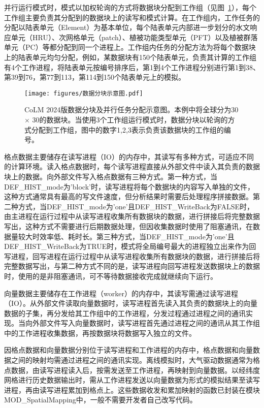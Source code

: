 \documentclass[a4paper,12pt,twoside]{article}
\begin{document}
并行运行模式时，模式以加权轮询的方式将数据块分配到工作组（见图~\ref{fig:fig_block}），每个工作组主要负责其分配到的数据块上的读写和模式计算。在工作组内，工作任务的分配以陆表单元（Element）为基本单位，每个陆表单元内部进一步划分的水文响应单元（HRU）、次网格单元（patch）、植被功能类型单元（PFT）以及植被群落单元（PC）等都分配到同一个进程上。工作组内任务的分配方法为将每个数据块上的陆表单元均匀分配，例如，某数据块有150个陆表单元，负责其计算的工作组有4个工作进程，将陆表单元按编号排序后，第1到4个工作进程分别进行第1到38、第39到76，第77到113，第114到150个陆表单元上的模拟。

\begin{figure}[htpb]
    \centering
    \texttt{[image: figures/数据分块示意图.pdf]}
    \caption{CoLM 2024版数据分块及并行任务分配示意图。本例中将全球分为30\textdegree$\times$ 30\textdegree 的数据块。当使用3个工作组运行模式时，数据分块以轮询的方式分配到工作组，图中的数字1,2,3表示负责该数据块的工作组的编号。}
    \label{fig:fig_block}
\end{figure}

格点数据主要储存在读写进程（IO）的内存中，其读写有多种方式，可适应不同的计算环境。读入格点数据时，每个读写进程直接从外部文件中读入其负责的数据块上的数据。向外部文件写入格点数据有三种方式。第一种方式，当DEF\_HIST\_mode为'block'时，读写进程将每个数据块的内容写入单独的文件，这种方式通常具有最高的写文件速度，但分析结果时需要后处理程序拼接数据。第二种方式，当DEF\_HIST\_mode为'one'且DEF\_HIST\_WriteBack为FALSE时，由主进程在运行过程中从读写进程收集所有数据块的数据，进行拼接后将完整数据写出，这种方式不需要进行后期数据处理，但因收集数据时使用了阻塞通讯，在数据量较大时效率低、耗时长。第三种方式，当DEF\_HIST\_mode为'one'且DEF\_HIST\_WriteBack为TRUE时，模式将全局编号最大的进程独立出来作为回写进程，回写进程在运行过程中从读写进程收集所有数据块的数据，进行拼接后将完整数据写出，与第二种方式不同的是，读写进程向回写进程发送数据块上的数据时，使用的是非阻塞通讯，可不等待数据接收完成就继续向下运行。

向量数据主要储存在工作进程（worker）的内存中，其读写需通过读写进程（IO）。从外部文件读取向量数据时，读写进程首先读入其负责的数据块上的向量数据的子集，再分发给其工作组中的工作进程，分发过程通过进程之间的通讯实现。当向外部文件写入向量数据时，读写进程首先通过进程之间的通讯从其工作组中的工作进程收集数据，再按数据块将数据写入独立的文件。

因格点数据和向量数据分别位于读写进程和工作进程的内存中，格点数据和向量数据之间的映射均需通过进程之间的通讯实现。离线模拟时，大气驱动数据通常为格点数据，由读写进程读入后，按需发送至工作进程，再映射到向量数据。以经纬度网格进行历史数据输出时，需从工作进程发送以向量数据为形式的模拟结果至读写进程，再由读写进程累加到格点上。这些数据收发和累加映射的函数已封装在模块MOD\_SpatialMapping中，一般不需要开发者自己改写代码。
\end{document}
